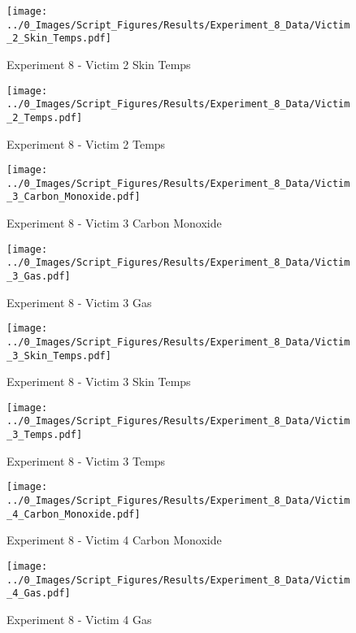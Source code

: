 	\clearpage

	\begin{figure}[H]
		\centering
		\texttt{[image: ../0\_Images/Script\_Figures/Results/Experiment\_8\_Data/Victim\_2\_Skin\_Temps.pdf]}
		\caption[]{Experiment 8 - Victim 2 Skin Temps}
	\end{figure}
 

	\begin{figure}[H]
		\centering
		\texttt{[image: ../0\_Images/Script\_Figures/Results/Experiment\_8\_Data/Victim\_2\_Temps.pdf]}
		\caption[]{Experiment 8 - Victim 2 Temps}
	\end{figure}
 
	\clearpage

	\begin{figure}[H]
		\centering
		\texttt{[image: ../0\_Images/Script\_Figures/Results/Experiment\_8\_Data/Victim\_3\_Carbon\_Monoxide.pdf]}
		\caption[]{Experiment 8 - Victim 3 Carbon Monoxide}
	\end{figure}
 

	\begin{figure}[H]
		\centering
		\texttt{[image: ../0\_Images/Script\_Figures/Results/Experiment\_8\_Data/Victim\_3\_Gas.pdf]}
		\caption[]{Experiment 8 - Victim 3 Gas}
	\end{figure}
 
	\clearpage

	\begin{figure}[H]
		\centering
		\texttt{[image: ../0\_Images/Script\_Figures/Results/Experiment\_8\_Data/Victim\_3\_Skin\_Temps.pdf]}
		\caption[]{Experiment 8 - Victim 3 Skin Temps}
	\end{figure}
 

	\begin{figure}[H]
		\centering
		\texttt{[image: ../0\_Images/Script\_Figures/Results/Experiment\_8\_Data/Victim\_3\_Temps.pdf]}
		\caption[]{Experiment 8 - Victim 3 Temps}
	\end{figure}
 
	\clearpage

	\begin{figure}[H]
		\centering
		\texttt{[image: ../0\_Images/Script\_Figures/Results/Experiment\_8\_Data/Victim\_4\_Carbon\_Monoxide.pdf]}
		\caption[]{Experiment 8 - Victim 4 Carbon Monoxide}
	\end{figure}
 

	\begin{figure}[H]
		\centering
		\texttt{[image: ../0\_Images/Script\_Figures/Results/Experiment\_8\_Data/Victim\_4\_Gas.pdf]}
		\caption[]{Experiment 8 - Victim 4 Gas}
	\end{figure}
 
